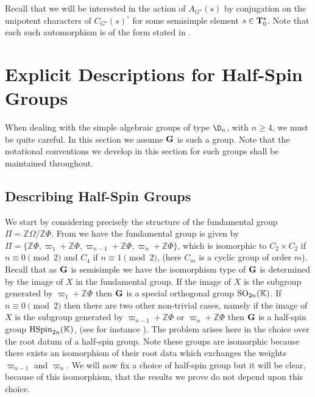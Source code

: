 \documentclass[eqthmnum]{jt-calcs}
\renewcommand{\cref}{\Cref}
\begin{document}
\begin{rem}
Recall that we will be interested in the action of $A_{G^{\star}}(s)$ by conjugation on the unipotent characters of $C_{G^{\star}}(s)^{\circ}$ for some semisimple element $s \in \mathbf{T}_0^{\star}$. Note that each such automorphism is of the form stated in \cref{lem:invariance-unipotent}.
\end{rem}

\section{Explicit Descriptions for Half-Spin Groups}\label{sec:clarification-typeD}
When dealing with the simple algebraic groups of type $\D_n$, with $n \geqslant 4$, we must be quite careful. In this section we assume $\mathbf{G}$ is such a group. Note that the notational conventions we develop in this section for such groups shall be maintained throughout.

\subsection{Describing Half-Spin Groups}
\begin{pa}
We start by considering precisely the structure of the fundamental group $\Pi = \mathbb{Z}\Omega/\mathbb{Z}\Phi$. From \cite[Plate IV(VIII)]{bourbaki:2002:lie-groups-chap-4-6} we have the fundamental group is given by $\Pi = \{\mathbb{Z}\Phi,\varpi_1 + \mathbb{Z}\Phi, \varpi_{n-1} + \mathbb{Z}\Phi, \varpi_n + \mathbb{Z}\Phi\}$, which is isomorphic to $C_2 \times C_2$ if $n \equiv 0 \pmod{2}$ and $C_4$ if $n \equiv 1 \pmod{2}$, (here $C_m$ is a cyclic group of order $m$). Recall that as $\mathbf{G}$ is semisimple we have the isomorphism type of $\mathbf{G}$ is determined by the image of $X$ in the fundamental group. If the image of $X$ is the subgroup generated by $\varpi_1 + \mathbb{Z}\Phi$ then $\mathbf{G}$ is a special orthogonal group $\operatorname{SO}_{2n}(\mathbb{K})$. If $n \equiv 0 \pmod{2}$ then there are two other non-trivial cases, namely if the image of $X$ is the subgroup generated by $\varpi_{n-1} + \mathbb{Z}\Phi$ or $\varpi_n + \mathbb{Z}\Phi$ then $\mathbf{G}$ is a half-spin group $\operatorname{HSpin}_{2n}(\mathbb{K})$, (see for instance \cite[\S 7]{carter:1981:centralisers-s/s-classical-groups}). The problem arises here in the choice over the root datum of a half-spin group. Note these groups are isomorphic because there exists an isomorphism of their root data which exchanges the weights $\varpi_{n-1}$ and $\varpi_n$. We will now fix a choice of half-spin group but it will be clear, because of this isomorphism, that the results we prove do not depend upon this choice.
\end{pa}
\end{document}
